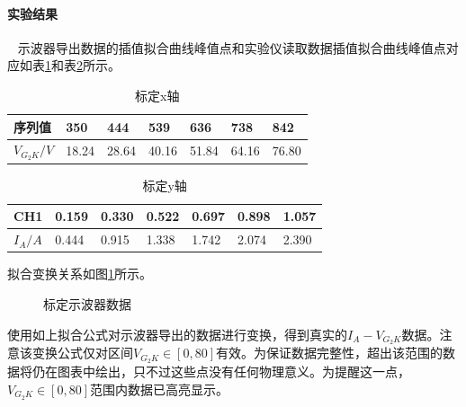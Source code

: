 \documentclass[12pt,a4paper,UTF8]{ctexart}
\begin{document}
		\paragraph{实验结果}~
		\newline
		\indent
		示波器导出数据的插值拟合曲线峰值点和实验仪读取数据插值拟合曲线峰值点对应如表\ref{tab:scale-x}和表\ref{tab:scale-y}所示。
		\begin{table}[htbp]
			\centering
			\begin{tabular}{|l|l|l|l|l|l|l|}
			\hline
				序列值 & 350 & 444 & 539 & 636 & 738 & 842 \\ \hline
				$V_{G_2K}/V$ & 18.24 & 28.64 & 40.16 & 51.84 & 64.16 & 76.80 \\ \hline
			\end{tabular}
			\caption{标定x轴}
			\label{tab:scale-x}
		\end{table}

		\begin{table}[htbp]
			\centering
			\begin{tabular}{|l|l|l|l|l|l|l|}
			\hline
				CH1 & 0.159 & 0.330 & 0.522 & 0.697 & 0.898 & 1.057 \\ \hline
				$I_A/A$ & 0.444 & 0.915 & 1.338 & 1.742 & 2.074 & 2.390 \\ \hline
			\end{tabular}
			\caption{标定y轴}
			\label{tab:scale-y}
		\end{table}
		拟合变换关系如图\ref{fig:5}所示。

		\begin{figure}[htbp]
			\centering
			\caption{标定示波器数据}
			\label{fig:5}
		\end{figure}
		使用如上拟合公式对示波器导出的数据进行变换，得到真实的$I_A-V_{G_2K}$数据。注意该变换公式仅对区间$V_{G_2K} \in [0,80]$有效。为保证数据完整性，超出该范围的数据将仍在图表中绘出，只不过这些点没有任何物理意义。为提醒这一点，$V_{G_2K} \in [0,80]$范围内数据已高亮显示。
	
\end{document}
